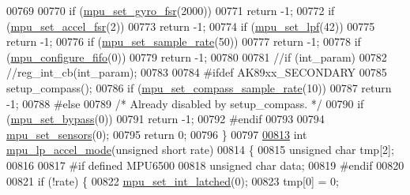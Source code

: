 \begin{DoxyCode}
{{{{00769 
00770     \textcolor{keywordflow}{if} (\hyperlink{group___d_r_i_v_e_r_s_gad09e6031c8677adc0b8a39b6deea8e27}{mpu\_set\_gyro\_fsr}(2000))
00771         \textcolor{keywordflow}{return} -1;
00772     \textcolor{keywordflow}{if} (\hyperlink{group___d_r_i_v_e_r_s_ga2713a96af104cfb2ae8e0ed4c3718119}{mpu\_set\_accel\_fsr}(2))
00773         \textcolor{keywordflow}{return} -1;
00774     \textcolor{keywordflow}{if} (\hyperlink{group___d_r_i_v_e_r_s_ga5661a9dee25152166769910767a2a93d}{mpu\_set\_lpf}(42))
00775         \textcolor{keywordflow}{return} -1;
00776     \textcolor{keywordflow}{if} (\hyperlink{group___d_r_i_v_e_r_s_ga0144d666a67a82888b8580002afe8b55}{mpu\_set\_sample\_rate}(50))
00777         \textcolor{keywordflow}{return} -1;
00778     \textcolor{keywordflow}{if} (\hyperlink{group___d_r_i_v_e_r_s_gababbdda287e1f19323489f90a0889dd7}{mpu\_configure\_fifo}(0))
00779         \textcolor{keywordflow}{return} -1;
00780 
00781     \textcolor{comment}{//if (int\_param)}
00782         \textcolor{comment}{//reg\_int\_cb(int\_param);}
00783 
00784 \textcolor{preprocessor}{#ifdef AK89xx\_SECONDARY}
00785     setup\_compass();
00786     \textcolor{keywordflow}{if} (\hyperlink{group___d_r_i_v_e_r_s_ga78da3828de0ef9d080c4d03e7bc45e7b}{mpu\_set\_compass\_sample\_rate}(10))
00787         \textcolor{keywordflow}{return} -1;
00788 \textcolor{preprocessor}{#else}
00789     \textcolor{comment}{/* Already disabled by setup\_compass. */}
00790     \textcolor{keywordflow}{if} (\hyperlink{group___d_r_i_v_e_r_s_ga36f70f38371b48d81094d3b061233e15}{mpu\_set\_bypass}(0))
00791         \textcolor{keywordflow}{return} -1;
00792 \textcolor{preprocessor}{#endif}
00793 
00794     \hyperlink{group___d_r_i_v_e_r_s_ga6e77e7cc1cf6be5e8fdf617c5b4586d1}{mpu\_set\_sensors}(0);
00795     \textcolor{keywordflow}{return} 0;
00796 \}
00797 
\hypertarget{inv__mpu_8c_source.tex_l00813}{}\hyperlink{group___d_r_i_v_e_r_s_gabdcf10922a1a20f1b5bbd7576d3189b9}{00813} \textcolor{keywordtype}{int} \hyperlink{group___d_r_i_v_e_r_s_gabdcf10922a1a20f1b5bbd7576d3189b9}{mpu\_lp\_accel\_mode}(\textcolor{keywordtype}{unsigned} \textcolor{keywordtype}{short} rate)
00814 \{
00815     \textcolor{keywordtype}{unsigned} \textcolor{keywordtype}{char} tmp[2];
00816 
00817 \textcolor{preprocessor}{#if defined MPU6500}
00818     \textcolor{keywordtype}{unsigned} \textcolor{keywordtype}{char} data;
00819 \textcolor{preprocessor}{#endif}
00820 
00821     \textcolor{keywordflow}{if} (!rate) \{
00822         \hyperlink{group___d_r_i_v_e_r_s_ga653cb855300bff9285ce4b8dca6a503b}{mpu\_set\_int\_latched}(0);
00823         tmp[0] = 0;
}}}}
\end{DoxyCode}
